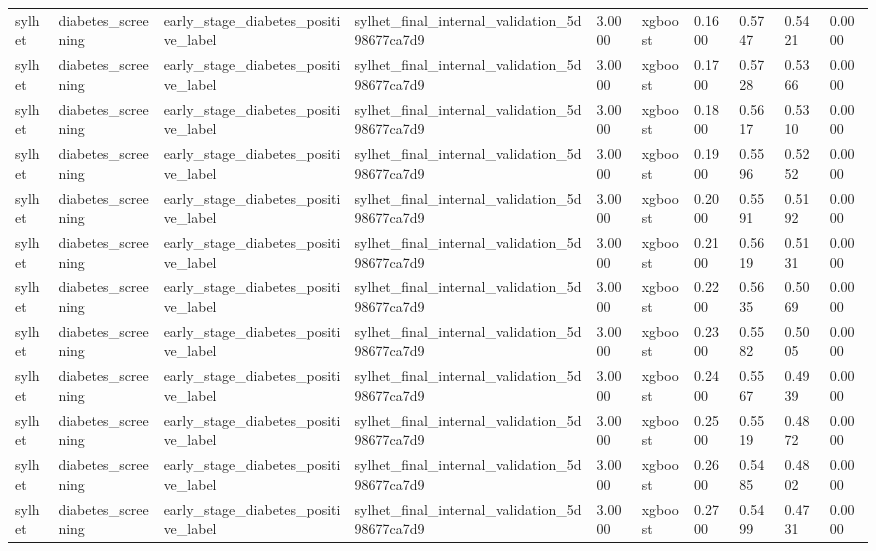 \begin{tabular}{llllllllll}
sylhet & diabetes\_screening & early\_stage\_diabetes\_positive\_label & sylhet\_final\_internal\_validation\_5d98677ca7d9 & 3.0000 & xgboost & 0.1600 & 0.5747 & 0.5421 & 0.0000 \\
sylhet & diabetes\_screening & early\_stage\_diabetes\_positive\_label & sylhet\_final\_internal\_validation\_5d98677ca7d9 & 3.0000 & xgboost & 0.1700 & 0.5728 & 0.5366 & 0.0000 \\
sylhet & diabetes\_screening & early\_stage\_diabetes\_positive\_label & sylhet\_final\_internal\_validation\_5d98677ca7d9 & 3.0000 & xgboost & 0.1800 & 0.5617 & 0.5310 & 0.0000 \\
sylhet & diabetes\_screening & early\_stage\_diabetes\_positive\_label & sylhet\_final\_internal\_validation\_5d98677ca7d9 & 3.0000 & xgboost & 0.1900 & 0.5596 & 0.5252 & 0.0000 \\
sylhet & diabetes\_screening & early\_stage\_diabetes\_positive\_label & sylhet\_final\_internal\_validation\_5d98677ca7d9 & 3.0000 & xgboost & 0.2000 & 0.5591 & 0.5192 & 0.0000 \\
sylhet & diabetes\_screening & early\_stage\_diabetes\_positive\_label & sylhet\_final\_internal\_validation\_5d98677ca7d9 & 3.0000 & xgboost & 0.2100 & 0.5619 & 0.5131 & 0.0000 \\
sylhet & diabetes\_screening & early\_stage\_diabetes\_positive\_label & sylhet\_final\_internal\_validation\_5d98677ca7d9 & 3.0000 & xgboost & 0.2200 & 0.5635 & 0.5069 & 0.0000 \\
sylhet & diabetes\_screening & early\_stage\_diabetes\_positive\_label & sylhet\_final\_internal\_validation\_5d98677ca7d9 & 3.0000 & xgboost & 0.2300 & 0.5582 & 0.5005 & 0.0000 \\
sylhet & diabetes\_screening & early\_stage\_diabetes\_positive\_label & sylhet\_final\_internal\_validation\_5d98677ca7d9 & 3.0000 & xgboost & 0.2400 & 0.5567 & 0.4939 & 0.0000 \\
sylhet & diabetes\_screening & early\_stage\_diabetes\_positive\_label & sylhet\_final\_internal\_validation\_5d98677ca7d9 & 3.0000 & xgboost & 0.2500 & 0.5519 & 0.4872 & 0.0000 \\
sylhet & diabetes\_screening & early\_stage\_diabetes\_positive\_label & sylhet\_final\_internal\_validation\_5d98677ca7d9 & 3.0000 & xgboost & 0.2600 & 0.5485 & 0.4802 & 0.0000 \\
sylhet & diabetes\_screening & early\_stage\_diabetes\_positive\_label & sylhet\_final\_internal\_validation\_5d98677ca7d9 & 3.0000 & xgboost & 0.2700 & 0.5499 & 0.4731 & 0.0000 \\

\end{tabular}
